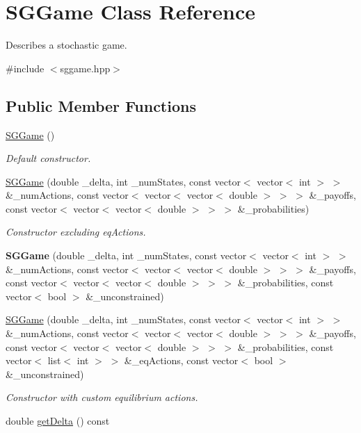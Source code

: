 \hypertarget{classSGGame}{\section{S\-G\-Game Class Reference}
\label{classSGGame}
}


Describes a stochastic game.  




{\ttfamily \#include $<$sggame.\-hpp$>$}

\subsection*{Public Member Functions}
\begin{DoxyCompactItemize}
\item 
\hypertarget{classSGGame_a935fc76700c675f842dc1666ffe2e8f7}{\hyperlink{classSGGame_a935fc76700c675f842dc1666ffe2e8f7}{S\-G\-Game} ()}\label{classSGGame_a935fc76700c675f842dc1666ffe2e8f7}

\begin{DoxyCompactList}\small\item\em Default constructor. \end{DoxyCompactList}\item 
\hyperlink{classSGGame_ad881fb3f3db38d4b7c2ea0beb7181fc0}{S\-G\-Game} (double \-\_\-delta, int \-\_\-num\-States, const vector$<$ vector$<$ int $>$ $>$ \&\-\_\-num\-Actions, const vector$<$ vector$<$ vector$<$ double $>$ $>$ $>$ \&\-\_\-payoffs, const vector$<$ vector$<$ vector$<$ double $>$ $>$ $>$ \&\-\_\-probabilities)
\begin{DoxyCompactList}\small\item\em Constructor excluding eq\-Actions. \end{DoxyCompactList}\item 
\hypertarget{classSGGame_ad4d48551202bda3c56f8860a24f04260}{{\bfseries S\-G\-Game} (double \-\_\-delta, int \-\_\-num\-States, const vector$<$ vector$<$ int $>$ $>$ \&\-\_\-num\-Actions, const vector$<$ vector$<$ vector$<$ double $>$ $>$ $>$ \&\-\_\-payoffs, const vector$<$ vector$<$ vector$<$ double $>$ $>$ $>$ \&\-\_\-probabilities, const vector$<$ bool $>$ \&\-\_\-unconstrained)}\label{classSGGame_ad4d48551202bda3c56f8860a24f04260}

\item 
\hyperlink{classSGGame_add5a4dac93d24cb6221240087e98bf5d}{S\-G\-Game} (double \-\_\-delta, int \-\_\-num\-States, const vector$<$ vector$<$ int $>$ $>$ \&\-\_\-num\-Actions, const vector$<$ vector$<$ vector$<$ double $>$ $>$ $>$ \&\-\_\-payoffs, const vector$<$ vector$<$ vector$<$ double $>$ $>$ $>$ \&\-\_\-probabilities, const vector$<$ list$<$ int $>$ $>$ \&\-\_\-eq\-Actions, const vector$<$ bool $>$ \&\-\_\-unconstrained)
\begin{DoxyCompactList}\small\item\em Constructor with custom equilibrium actions. \end{DoxyCompactList}\item 
\hypertarget{classSGGame_aee24f14d00ca8b02a0a255d954eea0f2}{double \hyperlink{classSGGame_aee24f14d00ca8b02a0a255d954eea0f2}{get\-Delta} () const }\label{classSGGame_aee24f14d00ca8b02a0a255d954eea0f2}


\end{DoxyCompactItemize}
